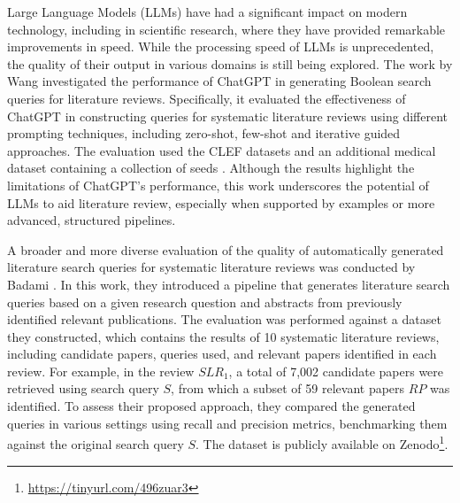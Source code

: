 Large Language Models (LLMs) have had a significant impact on modern technology, including in scientific research, where they have provided remarkable improvements in speed. While the processing speed of LLMs is unprecedented, the quality of their output in various domains is still being explored. The work by Wang \autocite{wang2023can} investigated the performance of ChatGPT in generating Boolean search queries for literature reviews. Specifically, it evaluated the effectiveness of ChatGPT in constructing queries for systematic literature reviews using different prompting techniques, including zero-shot, few-shot and iterative guided approaches. The evaluation used the CLEF datasets \autocite{kanoulas2017clef, kanoulas2018clef, kanoulas2019clef} and an additional medical dataset containing a collection of seeds \autocite{Wang_2022}. Although the results highlight the limitations of ChatGPT's performance, this work underscores the potential of LLMs to aid literature review, especially when supported by examples or more advanced, structured pipelines.

A broader and more diverse evaluation of the quality of automatically generated literature search queries for systematic literature reviews was conducted by Badami \autocite{badami2023adaptive}. In this work, they introduced a pipeline that generates literature search queries based on a given research question and abstracts from previously identified relevant publications. The evaluation was performed against a dataset they constructed, which contains the results of 10 systematic literature reviews, including candidate papers, queries used, and relevant papers identified in each review. For example, in the review $SLR_1$, a total of 7,002 candidate papers were retrieved using search query $S$, from which a subset of 59 relevant papers $RP$ was identified. To assess their proposed approach, they compared the generated queries in various settings using recall and precision metrics, benchmarking them against the original search query $S$. The dataset is publicly available on Zenodo\footnote{\url{https://tinyurl.com/496zuar3}}.
